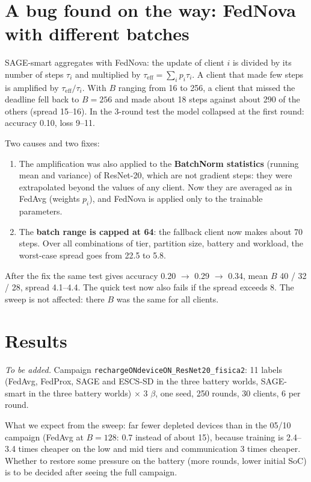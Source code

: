 \documentclass[11pt,a4paper]{article}
\begin{document}
\section{A bug found on the way: FedNova with different batches}

SAGE-smart aggregates with FedNova: the update of client $i$ is divided by
its number of steps $\tau_i$ and multiplied by
$\tau_\text{eff}=\sum_i p_i \tau_i$. A client that made few steps is amplified
by $\tau_\text{eff}/\tau_i$. With $B$ ranging from 16 to 256, a client that
missed the deadline fell back to $B=256$ and made about 18 steps against
about 290 of the others (spread 15--16). In the 3-round test the model
collapsed at the first round: accuracy 0.10, loss 9--11.

Two causes and two fixes:
\begin{enumerate}
  \item The amplification was also applied to the \textbf{BatchNorm
        statistics} (running mean and variance) of ResNet-20, which are not
        gradient steps: they were extrapolated beyond the values of any
        client. Now they are averaged as in FedAvg (weights $p_i$), and
        FedNova is applied only to the trainable parameters.
  \item The \textbf{batch range is capped at 64}: the fallback client now
        makes about 70 steps. Over all combinations of tier, partition size,
        battery and workload, the worst-case spread goes from 22.5 to 5.8.
\end{enumerate}
After the fix the same test gives accuracy 0.20 $\to$ 0.29 $\to$ 0.34, mean
$B$ 40 / 32 / 28, spread 4.1--4.4. The quick test now also fails if the
spread exceeds 8. The sweep is not affected: there $B$ was the same for all
clients.

\section{Results}
\label{sec:results}

\emph{To be added.} Campaign \texttt{rechargeONdeviceON\_ResNet20\_fisica2}:
11 labels (FedAvg, FedProx, SAGE and ESCS-SD in the three battery worlds,
SAGE-smart in the three battery worlds) $\times$ 3 $\beta$, one seed, 250
rounds, 30 clients, 6 per round.

What we expect from the sweep: far fewer depleted devices than in the 05/10
campaign (FedAvg at $B=128$: 0.7 instead of about 15), because training is
2.4--3.4 times cheaper on the low and mid tiers and communication 3 times
cheaper. Whether to restore some pressure on the battery (more rounds, lower
initial SoC) is to be decided after seeing the full campaign.
\end{document}
